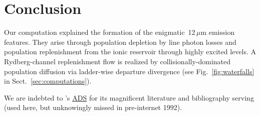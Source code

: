 \documentclass{aa}    %
\def\acp#1{\pdftooltip{\acs{#1}}{\acl{#1}}}
\def\MgI{\ion{Mg}{I}}          %
\begin{document}
\section{Conclusion} \label{sec:conclusion}
Our computation explained the formation of the enigmatic
\MgI\,12\,$\mu$m emission features.
They arise through population depletion by line photon losses and
population replenishment from the ionic reservoir through highly
excited levels.
A Rydberg-channel replenishment flow is realized by
collisionally-dominated population diffusion via ladder-wise departure
divergence (see Fig.~\ref{fig:waterfalls} in
Sect.~\ref{sec:computations}).  

\begin{acknowledgements} %
We are indebted to \acp{NASA}'s \href{http://adsabs.harvard.edu}{ADS}
for its magnificent literature and bibliography serving (used here,
but unknowingly missed in pre-internet 1992).
\end{acknowledgements}

\end{document}
